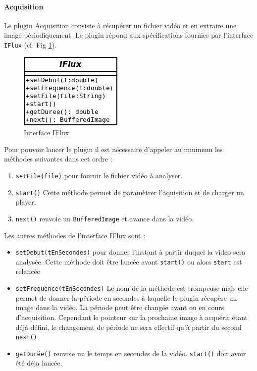 		\paragraph{Acquisition}
		Le plugin Acquisition consiste à récupérer un fichier vidéo et en extraire une image périodiquement. Le plugin répond aux spécifications fournies par l'interface \verb+IFlux+ (cf. Fig \ref{fig:IFlux}).
		\begin{figure}[htbp]
			\centering
			\includegraphics[scale=0.50]{img/IFlux}
			\caption{Interface IFlux}
			\label{fig:IFlux}
		\end{figure}

		Pour pouvoir lancer le plugin il est nécessaire d'appeler au minimum les méthodes suivantes dans cet ordre :
		\begin{enumerate}
			\item{\verb+setFile(file)+} pour fournir le fichier vidéo à analyser.
			\item{\verb+start()+} Cette méthode permet de paramètrer l'aquisition et de charger un player. 
			\item{\verb+next()+} renvoie un \verb+BufferedImage+ et avance dans la vidéo.
		\end{enumerate}

		Les autres méthodes de l'interface IFlux sont :
		\begin{itemize}
			\item{\verb+setDebut(tEnSecondes)+} pour donner l'instant à partir duquel la vidéo sera analysée. Cette méthode doit être lancée avant \verb+start()+ ou alors \verb+start+ est relancée
			\item{\verb+setFrequence(tEnSecondes)+} Le nom de la méthode est trompeuse mais elle permet de donner la période en secondes à laquelle le plugin récupère un image dans la vidéo. La période peut être changée avant ou en cours d'acquisition. Cependant le pointeur sur la prochaine image à acquérir étant déjà défini, le changement de période ne sera effectif qu'à partir du second \verb+next()+
			\item{\verb+getDurée()+} renvoie un le temps en secondes de la vidéo. \verb+start()+ doit avoir été déja lancée.
		\end{itemize}

